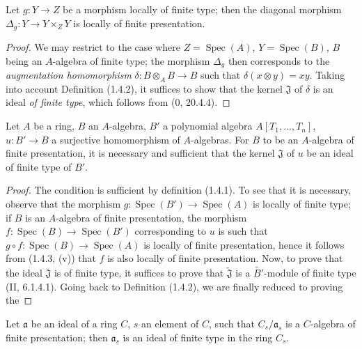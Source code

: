 \begin{corollary}[1.4.3.1]
\label{IV.1.4.3.1}
Let $g:Y\to Z$ be a morphism locally of finite type; then the diagonal
morphism $\Delta_g:Y\to Y\times_ZY$ is locally of finite presentation.
\end{corollary}


\begin{proof}
We may restrict to the case where $Z=\operatorname{Spec}(A)$, $Y=\operatorname{Spec}(B)$, $B$ being an
$A$-algebra of finite type; the morphism $\Delta_g$ then corresponds to
the \emph{augmentation homomorphism} $\delta:B\otimes_AB\to B$ such that
$\delta(x\otimes y)=xy$. Taking into account Definition (1.4.2), it suffices
to show that the kernel $\mathfrak J$ of $\delta$ is an ideal \emph{of finite
type}, which follows from (0, 20.4.4).
\end{proof}

\begin{proposition}[1.4.4]
\label{IV.1.4.4}
Let $A$ be a ring, $B$ an $A$-algebra, $B'$ a polynomial algebra
$A[T_1,\ldots,T_n]$, $u:B'\to B$ a surjective homomorphism of
$A$-algebras. For $B$ to be an $A$-algebra of finite presentation, it is
necessary and sufficient that the kernel $\mathfrak J$ of $u$ be an ideal of
finite type of $B'$.
\end{proposition}

\begin{proof}
The condition is sufficient by definition (1.4.1). To see that it is
necessary, observe that the morphism $g:\operatorname{Spec}(B')\to\operatorname{Spec}(A)$ is
locally of finite type; if $B$ is an $A$-algebra of finite presentation,
the morphism $f:\operatorname{Spec}(B)\to\operatorname{Spec}(B')$ corresponding to $u$ is such that
$g\circ f:\operatorname{Spec}(B)\to\operatorname{Spec}(A)$ is locally of finite presentation, hence it
follows from (1.4.3, (v)) that $f$ is also locally of finite presentation.
Now, to prove that the ideal $\mathfrak J$ is of finite type, it suffices to
prove that $\widetilde{\mathfrak J}$ is a $\widetilde{B'}$-module of finite
type (II, 6.1.4.1). Going back to Definition (1.4.2), we are finally reduced
to proving the
\end{proof}

\begin{lemma}[1.4.4.1]
\label{IV.1.4.4.1}
Let $\mathfrak a$ be an ideal of a ring $C$, $s$ an element of $C$, such that
$C_s/\mathfrak a_s$ is a $C$-algebra of finite presentation; then
$\mathfrak a_s$ is an ideal of finite type in the ring $C_s$.
\end{lemma}

